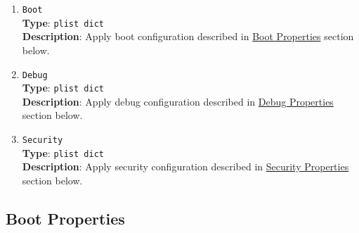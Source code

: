 \documentclass[]{article}
\begin{document}
\begin{enumerate}
\item
  \texttt{Boot}\\
  \textbf{Type}: \texttt{plist\ dict}\\
  \textbf{Description}: Apply boot configuration described in
  \hyperref[miscbootprops]{Boot Properties} section below.

\item
  \texttt{Debug}\\
  \textbf{Type}: \texttt{plist\ dict}\\
  \textbf{Description}: Apply debug configuration described in
  \hyperref[miscdebugprops]{Debug Properties} section below.

\item
  \texttt{Security}\\
  \textbf{Type}: \texttt{plist\ dict}\\
  \textbf{Description}: Apply security configuration described in
  \hyperref[miscsecurityprops]{Security Properties} section below.


\end{enumerate}

\subsection{Boot Properties}\label{miscbootprops}
\end{document}
